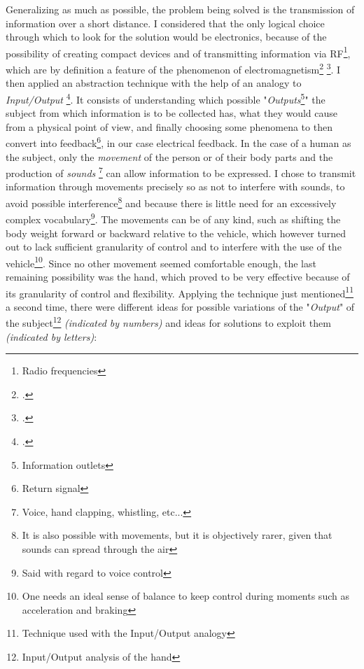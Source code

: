 \documentclass[a4paper, 10pt, final]{article} %
\begin{document}
    Generalizing as much as possible, the problem being solved is the transmission of information over a short distance.
    I considered that the only logical choice through which to look for the solution would be electronics, because of the possibility of creating compact devices and of transmitting information via RF\footnote{Radio frequencies}, which are by definition a feature of the phenomenon of electromagnetism\footcite["The" (electromagnetic) "field can be viewed as the combination of an electric field and a magnetic field"]{Electromagnetism:Wiki} \footcite["Electricity is related to magnetism, both being part of the phenomenon of electromagnetism"]{Electricity:Wiki}.
    I then applied an abstraction technique with the help of an analogy to \emph{Input/Output} \footcite[]{IO:Wiki}.
    It consists of understanding which possible "\emph{Outputs}\footnote{Information outlets}" the subject from which information is to be collected has, what they would cause from a physical point of view, and finally choosing some phenomena to then convert into feedback\footnote{Return signal}, in our case electrical feedback.
    In the case of a human as the subject, only the \emph{movement} of the person or of their body parts and the production of \emph{sounds} \footnote{Voice, hand clapping, whistling, etc...} can allow information to be expressed.
    I chose to transmit information through movements precisely so as not to interfere with sounds, to avoid possible interference\footnote{It is also possible with movements, but it is objectively rarer, given that sounds can spread through the air} and because there is little need for an excessively complex vocabulary\footnote{Said with regard to voice control}.
    The movements can be of any kind, such as shifting the body weight forward or backward relative to the vehicle, which however turned out to lack sufficient granularity of control and to interfere with the use of the vehicle\footnote{One needs an ideal sense of balance to keep control during moments such as acceleration and braking}.
    \clearpage  
    \noindent Since no other movement seemed comfortable enough, the last remaining possibility was the hand, which proved to be very effective because of its granularity of control and flexibility.
    Applying the technique just mentioned\footnote{Technique used with the Input/Output analogy} a second time,
    there were different ideas for possible variations of the "\emph{Output}" of the subject\footnote{Input/Output analysis of the hand} \emph{(indicated by numbers)} and ideas for solutions to exploit them \emph{(indicated by letters)}:
\end{document}
